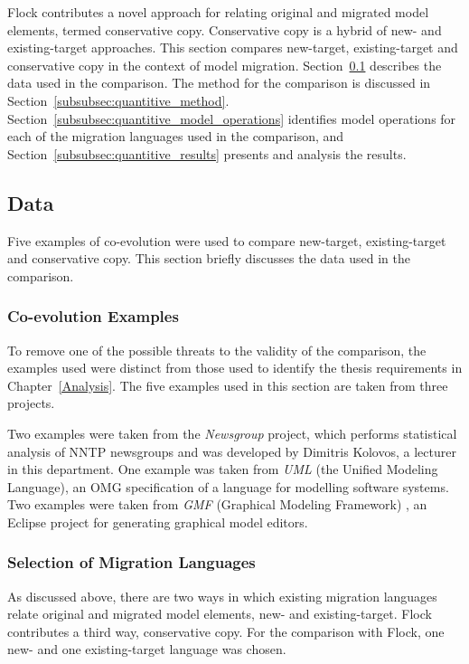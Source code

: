 Flock contributes a novel approach for relating original and migrated model elements, termed conservative copy. Conservative copy is a hybrid of new- and existing-target approaches. This section compares new-target, existing-target and conservative copy in the context of model migration. Section~\ref{subsubsec:quantitive_data} describes the data used in the comparison. The method for the comparison is discussed in Section~\ref{subsubsec:quantitive_method}. Section~\ref{subsubsec:quantitive_model_operations} identifies model operations for each of the migration languages used in the comparison, and Section~\ref{subsubsec:quantitive_results} presents and analysis the results.

\subsection{Data}
\label{subsubsec:quantitive_data}
Five examples of co-evolution were used to compare new-target, existing-target and conservative copy. This section briefly discusses the data used in the comparison.

\subsubsection{Co-evolution Examples}
To remove one of the possible threats to the validity of the comparison, the examples used were distinct from those used to identify the thesis requirements in Chapter~\ref{Analysis}. The five examples used in this section are taken from three projects.

Two examples were taken from the \emph{Newsgroup} project, which performs statistical analysis of NNTP newsgroups and was developed by Dimitris Kolovos, a lecturer in this department. One example was taken from \emph{UML} (the Unified Modeling Language), an OMG specification of a language for modelling software systems. Two examples were taken from \emph{GMF} (Graphical Modeling Framework) \cite{gronback09emp}, an Eclipse project for generating graphical model editors.

\subsubsection{Selection of Migration Languages}
As discussed above, there are two ways in which existing migration languages relate original and migrated model elements, new- and existing-target. Flock contributes a third way, conservative copy. For the comparison with Flock, one new- and one existing-target language was chosen.

